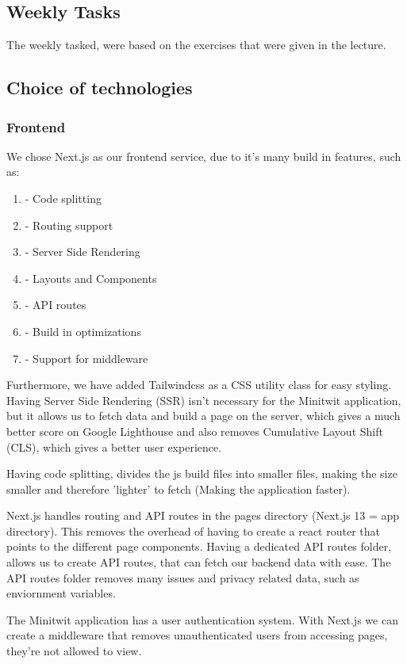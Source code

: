 \subsection{Weekly Tasks}
The weekly tasked, were based on the exercises that were given in the lecture.

\subsection{Choice of technologies}
\subsubsection{Frontend}
We chose Next.js as our frontend service, due to it's many build in features, such as:

\begin{enumerate}
    \item - Code splitting
    \item - Routing support
    \item- Server Side Rendering
    \item- Layouts and Components
    \item- API routes
    \item- Build in optimizations
    \item- Support for middleware
\end{enumerate}
Furthermore, we have added Tailwindcss as a CSS utility class for easy styling.
Having Server Side Rendering (SSR) isn't necessary for the Minitwit application, but it allows us to fetch data and build a page on the server, which gives a much better score on Google Lighthouse and also removes Cumulative Layout Shift (CLS), which gives a better user experience.

Having code splitting, divides the js build files into smaller files, making the size smaller and therefore 'lighter' to fetch (Making the application faster).

Next.js handles routing and API routes in the pages directory (Next.js 13 = app directory). This removes the overhead of having to create a react router that points to the different page components. Having a dedicated API routes folder, allows us to create API routes, that can fetch our backend data with ease. The API routes folder removes many issues and privacy related data, such as enviornment variables.

The Minitwit application has a user authentication system. With Next.js we can create a middleware that removes unauthenticated users from accessing pages, they're not allowed to view.
